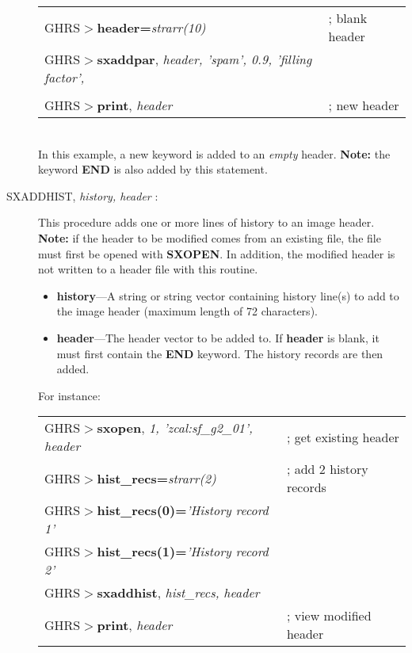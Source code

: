 \begin{description}
\begin{tabular}{ll}
GHRS$>${\bf header=}{\it strarr(10)} & ; blank header\\
GHRS$>${\bf sxaddpar}, {\it header, 'spam', 0.9, 'filling factor',} & \\ 
\hspace{1.1in}{\it format='f4.1'} & \\
GHRS$>${\bf print}, {\it header} & ; new header \\
\end{tabular}\\

\noindent
In this example, a new keyword is added to an {\it empty} header.  {\bf Note:} 
the keyword {\bf END} is also added by this statement.

\item [SXADDHIST, {\it history, header} :] 

This procedure adds one or more lines of history to an image header.  {\bf Note:} if the 
header to be modified comes from an existing file, the file must first be 
opened with {\bf SXOPEN}.  In addition, the modified header is not written to
a header file with this routine.

\begin{itemize}

\item {\bf history}---A string or string vector containing history line(s) to 
add  to the image header (maximum length of 72 characters).  

\item {\bf header}---The header vector to be added to.  If {\bf header} is
blank, it must first contain the {\bf END} keyword.  The history records are
then added.

\end{itemize}
\newpage
\noindent
For 
instance:\\

\begin{tabular}{ll}
GHRS$>${\bf sxopen}, {\it 1, 'zcal:sf\_g2\_01', header} & ; get existing header\\
GHRS$>${\bf hist\_recs=}{\it strarr(2)} & ; add 2 history records\\
GHRS$>${\bf hist\_recs(0)=}{\it 'History record 1'} & \\
GHRS$>${\bf hist\_recs(1)=}{\it 'History record 2'} & \\
GHRS$>${\bf sxaddhist}, {\it hist\_recs, header} & \\
GHRS$>${\bf print}, {\it header} & ; view modified header\\
\end{tabular}\\


\end{description}
